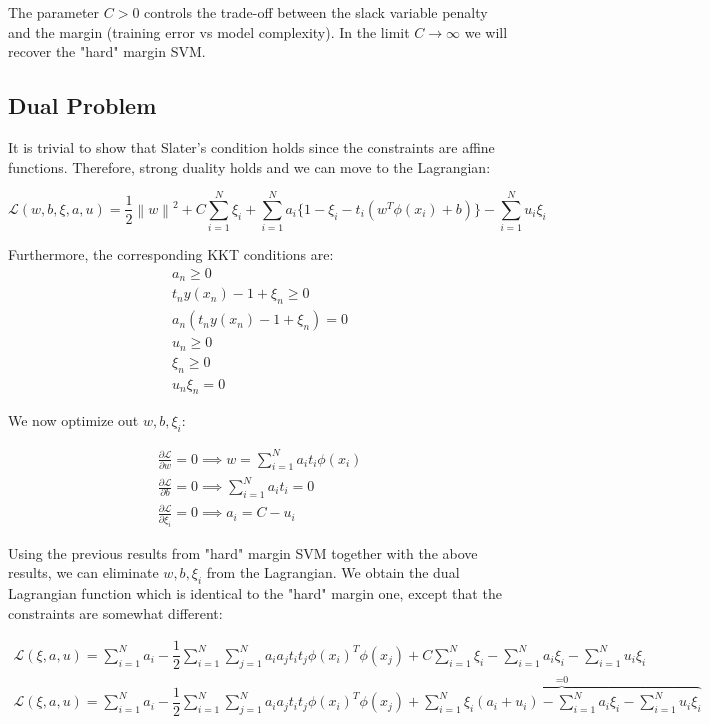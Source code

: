 \documentclass[twoside]{article}
\newcommand{\norm}[1]{\left\lVert #1 \right\rVert}
\begin{document}
The parameter $C > 0$ controls the trade-off between the slack variable penalty and the margin (training error vs model complexity). In the limit $C \xrightarrow{} \infty $ we will recover the "hard" margin SVM. 

\subsection{Dual Problem}
It is trivial to show that Slater's condition holds since the constraints are affine functions. Therefore, strong duality holds and we can move to the Lagrangian:

\begin{equation*}
    \mathcal{L}(w,b,\xi,a,u) = 
    \dfrac{1}{2} \norm{w}^2 + C \sum_{i=1}^{N} \xi_{i} + \sum_{i=1}^{N} a_{i} \{ 1 - \xi_{i} - t_{i} (w^T \phi(x_{i}) +b) \}
    - \sum_{i=1}^{N} u_{i}\xi_{i}
    \end{equation*}

Furthermore, the corresponding KKT conditions are:
\begin{align}
        a_{n} \geq 0 \\       
        t_{n}y(x_{n}) -1 +\xi_{n} \geq 0 \\
        a_{n}(t_{n}y(x_{n}) -1 +\xi_{n} ) = 0
        \\
        u_{n} \geq 0 \\
        \xi_{n} \geq 0 \\
        u_{n}\xi_{n} = 0
\end{align}


We now optimize out $w,b,\xi_{i}$:

\begin{align*}
        \frac{\partial{\mathcal{L}}}{\partial{w}} = 0 \implies w = \sum_{i=1}^{N} a_{i}t_{i}\phi(x_{i}) \\       \frac{\partial{\mathcal{L}}}{\partial{b}} = 0 \implies \sum_{i=1}^{N} a_{i}t_{i} = 0 \\
        \frac{\partial{\mathcal{L}}}{\partial{\xi_{i}}} = 0 \implies 
        a_{i} = C - u_{i}
\end{align*}

Using the previous results from "hard" margin SVM together with the above  results, we can  eliminate $w,b,\xi_{i}$ from the Lagrangian. We obtain the dual Lagrangian function which is identical to the "hard" margin one, except that the constraints are somewhat different:


\begin{align*}
         \mathcal{L}(\xi,a,u) = \sum_{i=1}^{N} a_{i}  - \dfrac{1}{2}
    \sum_{i=1}^{N} { \sum_{j=1}^{N} a_{i} a_{j} t_{i} t_{j} \phi(x_{i})^T \phi(x_{j})} + C \sum_{i=1}^{N} \xi_{i} - \sum_{i=1}^{N} a_{i} \xi_{i} -
         \sum_{i=1}^{N} u_{i} \xi_{i} \\       
          \mathcal{L}(\xi,a,u) = \sum_{i=1}^{N} a_{i}  - \dfrac{1}{2}
    \sum_{i=1}^{N} { \sum_{j=1}^{N} a_{i} a_{j} t_{i} t_{j} \phi(x_{i})^T \phi(x_{j})} +  \overbrace{\sum_{i=1}^{N} \xi_{i} (a_{i} + u_{i}) - \sum_{i=1}^{N} a_{i} \xi_{i} -
         \sum_{i=1}^{N} u_{i} \xi_{i}}^\text{=0} 
        \end{align*}
\end{document}
